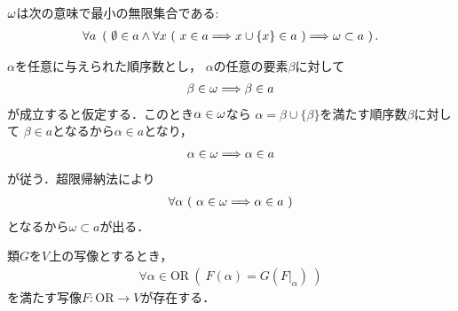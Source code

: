 	\begin{screen}
		\begin{thm}
		\label{thm:the_principle_of_mathematical_induction}
			${\bf \omega}$は次の意味で最小の無限集合である:
			\begin{align}
				\forall a\ \left(\ \emptyset \in a \wedge \forall x\ 
				(\ x \in a \Longrightarrow x \cup \{x\} \in a\ ) 
				\Longrightarrow {\bf \omega} \subset a\ \right).
			\end{align}
		\end{thm}
	\end{screen}
	
	\begin{prf}
		$\alpha$を任意に与えられた順序数とし，
		$\alpha$の任意の要素$\beta$に対して
		\begin{align}
			\beta \in {\bf \omega} \Longrightarrow \beta \in a
		\end{align}
		が成立すると仮定する．このとき$\alpha \in {\bf \omega}$なら
		$\alpha = \beta \cup \{\beta\}$を満たす順序数$\beta$に対して
		$\beta \in a$となるから$\alpha \in a$となり，
		\begin{align}
			\alpha \in {\bf \omega} \Longrightarrow \alpha \in a
		\end{align}
		が従う．超限帰納法により
		\begin{align}
			\forall \alpha\ (\ \alpha \in {\bf \omega} \Longrightarrow \alpha \in a\ )
		\end{align}
		となるから$\omega \subset a$が出る．
		\QED
	\end{prf}
	
	
	\begin{screen}
		\begin{thm}[超限帰納法による写像の構成]
			類$G$を$V$上の写像とするとき，
			\begin{align}
				\forall \alpha \in \mathrm{OR}\ (\ F(\alpha) = G(F|_\alpha)\ )
			\end{align}
			を満たす写像$F:\mathrm{OR} \longrightarrow V$が存在する．
		\end{thm}
	\end{screen}
	
